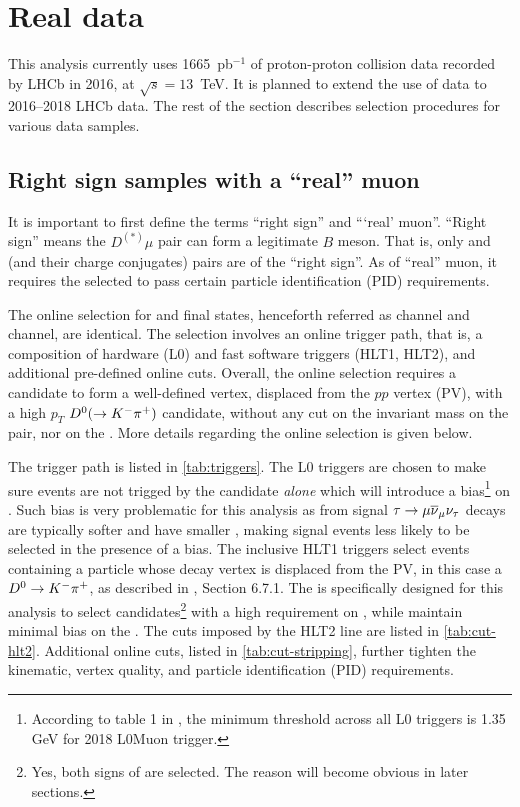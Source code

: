 \section{Real data}
\label{ref:sel:data}

This analysis currently uses 1665~pb$^{-1}$ of proton-proton collision data
recorded by LHCb in 2016, at $\sqrt{s} = 13$~TeV.
It is planned to extend the use of data to 2016--2018 LHCb data.
The rest of the section describes selection procedures for various data samples.


\subsection{Right sign samples with a ``real'' muon}
\label{ref:sel:data:rs}

It is important to first define the terms ``right sign'' and ```real' muon''.
``Right sign'' means the $D^{(*)} \mu$ pair can form a legitimate $B$ meson.
That is, only \Dz\mun and \Dstarp\mun (and their charge conjugates) pairs are
of the ``right sign''.
As of ``real'' muon, it requires the selected \muon to pass certain particle
identification (PID) requirements.

The online selection for \Dz\mun and \Dstarp\mun final states,
henceforth referred as \Dz channel and \Dstar channel,
are identical.
The selection involves an online trigger path,
that is,
a composition of hardware (L0) and fast software triggers (HLT1, HLT2),
and additional pre-defined online cuts.
Overall, the online selection requires a \muon candidate to form
a well-defined vertex,
displaced from the $pp$ vertex (PV),
with a high $p_T$ ${{D}^0} (\rightarrow {\ensuremath{{K}^-}} {\ensuremath{{\pi}^+}})$ candidate, without any cut on the
invariant mass on the \Dz\mupm pair, nor on the \muon \pt.
More details regarding the online selection is given below.

The trigger path is listed in \cref{tab:triggers}.
The L0 triggers are chosen to make sure events are not trigged by
the \muon candidate \emph{alone} which will introduce a \pt bias\footnote{
    According to table 1 in \cite{LHCb-DP-2019-001},
    the minimum \pt threshold across all L0 triggers is 1.35 GeV for 2018
    L0Muon trigger.
} on \muon.
Such bias is very problematic for this analysis as \muon from signal
${\tau} \rightarrow {\ensuremath{\mu}} {\ensuremath{{\overline{\nu}}_\mu}} {\ensuremath{{\nu}_\tau}}$ decays are typically softer and
have smaller \pt,
making signal events less likely to be selected in the presence of a \pt bias.
The inclusive HLT1 triggers select events containing a particle whose decay
vertex is displaced from the PV,
in this case a ${{D}^0} \rightarrow {\ensuremath{{K}^-}} {\ensuremath{{\pi}^+}}$,
as described in \cite{LHCb-INT-2019-025}, Section 6.7.1.
The  is specifically designed for this analysis
to select \Dz\mupm candidates\footnote{
    Yes, both signs of \muon are selected.
    The reason will become obvious in later sections.
} with a high \pt requirement on \Dz,
while maintain minimal \pt bias on the \mupm.
The cuts imposed by the HLT2 line are listed in \cref{tab:cut-hlt2}.
Additional online cuts,
listed in \cref{tab:cut-stripping},
further tighten the kinematic, vertex quality, and particle identification (PID)
requirements.


